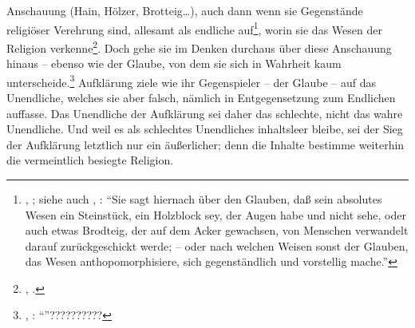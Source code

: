 Anschauung (Hain, Hölzer, Brotteig\dots), auch dann wenn sie Gegenstände
religiöser Verehrung sind, allesamt als endliche
auf\footnote{\cite{Hegel:GlaubenundWissenoderdieReflexionsphilosophiederSubjektivitaetinderVollstaendigkeitihrerFormenalsKantischeJacobischeundFichteschePhilosophie1968},
\cite[][IV: 316.10--317.15]{Hegel:GesammelteWerke}; siehe auch
\cite[][501]{Hegel:PhaenomenologiedesGeistes1980}, \cite[][IX:
300.2--7]{Hegel:GesammelteWerke}: \enquote{Sie sagt hiernach über den Glauben,
daß sein absolutes Wesen ein Steinstück, ein Holzblock sey, der Augen habe und
nicht sehe, oder auch etwas Brodteig, der auf dem Acker gewachsen, von Menschen
verwandelt darauf zurückgeschickt werde; -- oder nach welchen Weisen sonst der
Glauben, das Wesen anthopomorphisiere, sich gegenständlich und vorstellig
mache.}}, worin sie das Wesen der Religion
verkenne\footnote{\cite[Vgl.][\pno~501f.]{Hegel:PhaenomenologiedesGeistes1980},
\cite[][IX: 300.8--18]{Hegel:GesammelteWerke}.}.
Doch gehe sie im Denken durchaus über diese Anschauung hinaus -- ebenso wie der Glaube, von dem sie sich in Wahrheit kaum
unterscheide.\footnote{\cite[Vgl.][]{Hegel:PhaenomenologiedesGeistes1980},
\cite[][IX: ]{Hegel:GesammelteWerke}: \enquote{}??????????} Aufklärung ziele wie
ihr Gegenspieler -- der Glaube -- auf das Unendliche, welches sie aber falsch,
nämlich in Entgegensetzung zum Endlichen auffasse. Das Unendliche der Aufklärung
sei daher das schlechte, nicht das wahre Unendliche. Und weil es als schlechtes
Unendliches inhaltsleer bleibe, sei der Sieg der Aufklärung letztlich nur ein
äußerlicher; denn die Inhalte bestimme weiterhin die vermeintlich besiegte
Religion.

